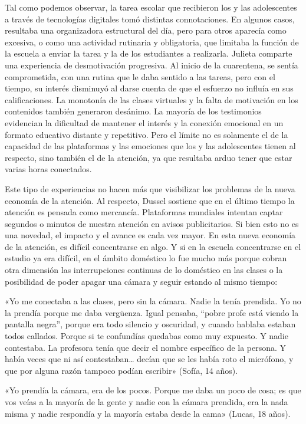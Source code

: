 \begin{refsection}
Tal como podemos observar, la tarea escolar que recibieron los y las adolescentes a través de tecnologías digitales tomó distintas connotaciones. En algunos casos, resultaba una organizadora estructural del día, pero para otros aparecía como excesiva, o como una actividad rutinaria y obligatoria, que limitaba la función de la escuela a enviar la tarea y la de los estudiantes a realizarla. Julieta comparte una experiencia de desmotivación progresiva. Al inicio de la cuarentena, se sentía comprometida, con una rutina que le daba sentido a las tareas, pero con el tiempo, su interés disminuyó al darse cuenta de que el esfuerzo no influía en sus calificaciones. La monotonía de las clases virtuales y la falta de motivación en los contenidos también generaron desánimo. La mayoría de los testimonios evidencian la dificultad de mantener el interés y la conexión emocional en un formato educativo distante y repetitivo. Pero el límite no es solamente el de la capacidad de las plataformas y las emociones que los y las adolescentes tienen al respecto, sino también el de la atención, ya que resultaba arduo tener que estar varias horas conectados.

Este tipo de experiencias no hacen más que visibilizar los problemas de la nueva economía de la atención. Al respecto, Dussel sostiene que en el último tiempo la atención es pensada como mercancía. Plataformas mundiales intentan captar segundos o minutos de nuestra atención en avisos publicitarios. Si bien esto no es una novedad, el impacto y el avance es cada vez mayor. En esta nueva economía de la atención, es difícil concentrarse en algo. Y si en la escuela concentrarse en el estudio ya era difícil, en el ámbito doméstico lo fue mucho más porque cobran otra dimensión las interrupciones continuas de lo doméstico en las clases o la posibilidad de poder apagar una cámara y seguir estando al mismo tiempo:


\begin{gbcita}
«Yo me conectaba a las clases, pero sin la cámara. Nadie la tenía prendida. Yo no la prendía porque me daba vergüenza. Igual pensaba, “pobre profe está viendo la pantalla negra”, porque era todo silencio y oscuridad, y cuando hablaba estaban todos callados. Porque si te confundías quedabas como muy expuesto. Y nadie contestaba. La profesora tenía que decir el nombre específico de la persona. Y había veces que ni así contestaban… decían que se les había roto el micrófono, y que por alguna razón tampoco podían escribir» (Sofía, 14 años).

«Yo prendía la cámara, era de los pocos. Porque me daba un poco de cosa; es que vos veías a la mayoría de la gente y nadie con la cámara prendida, era la nada misma y nadie respondía y la mayoría estaba desde la cama» (Lucas, 18 años).


\end{gbcita}
\end{refsection}

